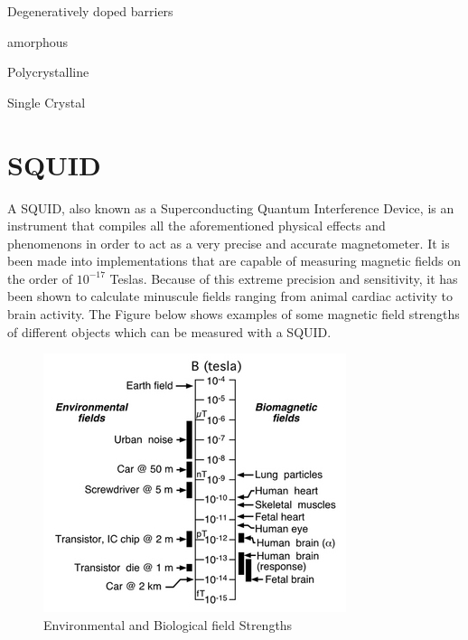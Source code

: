\documentclass[conf]{new-aiaa}
\begin{document}
Degeneratively doped barriers

amorphous

Polycrystalline

 Single Crystal
 
 



\pagebreak
\section{SQUID}

A SQUID, also known as a Superconducting Quantum Interference Device, is an instrument that compiles all the aforementioned physical effects and phenomenons in order to act as a very precise and accurate magnetometer. It is been made into implementations that are capable of measuring magnetic fields on the order of \(10^{-17}\) Teslas. Because of this extreme precision and sensitivity, it has been shown to calculate minuscule fields ranging from animal cardiac activity to brain activity. The Figure below shows examples of some magnetic field strengths of different objects which can be measured with a SQUID.

\begin{figure}[!h]
    \centering
    \includegraphics[scale = 0.5]{BFields.jpg}
    \caption{Environmental and Biological field Strengths}
\end{figure}
\end{document}
